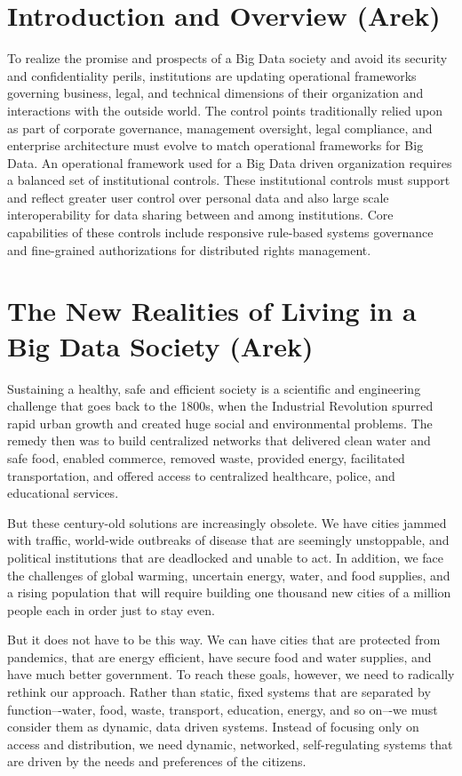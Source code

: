 \section{Introduction and Overview (Arek)}

To realize the promise and prospects of a Big Data society and avoid its security and confidentiality perils, institutions are updating operational frameworks governing business, legal, and technical dimensions of their organization and interactions with the outside world.
The control points traditionally relied upon as part of corporate governance, management oversight, legal compliance, and enterprise architecture must evolve to match operational frameworks for Big Data.
An operational framework used for a Big Data driven organization requires a balanced set of institutional controls.
These institutional controls must support and reflect greater user control over personal data and also large scale interoperability for data sharing between and among institutions.
Core capabilities of these controls include responsive rule-based systems governance and fine-grained authorizations for distributed rights management.

\section{The New Realities of Living in a Big Data Society (Arek)}

Sustaining a healthy, safe and efficient society is a scientific and engineering challenge that goes back to the 1800s, when the Industrial Revolution spurred rapid urban growth and created huge social and environmental problems.
The remedy then was to build centralized networks that delivered clean water and safe food, enabled commerce, removed waste, provided energy, facilitated transportation, and offered access to centralized healthcare, police, and educational services.

But these century-old solutions are increasingly obsolete.
We have cities jammed with traffic, world-wide outbreaks of disease that are seemingly unstoppable, and political institutions that are deadlocked and unable to act.
In addition, we face the challenges of global warming, uncertain energy, water, and food supplies, and a rising population that will require building one thousand new cities of a million people each in order just to stay even. 

But it does not have to be this way.
We can have cities that are protected from pandemics, that are energy efficient, have secure food and water supplies, and have much better government.
To reach these goals, however, we need to radically rethink our approach.
Rather than static, fixed systems that are separated by function–-water, food, waste, transport, education, energy, and so on–-we must consider them as dynamic, data driven systems.
Instead of focusing only on access and distribution, we need dynamic, networked, self-regulating systems that are driven by the needs and preferences of the citizens.

